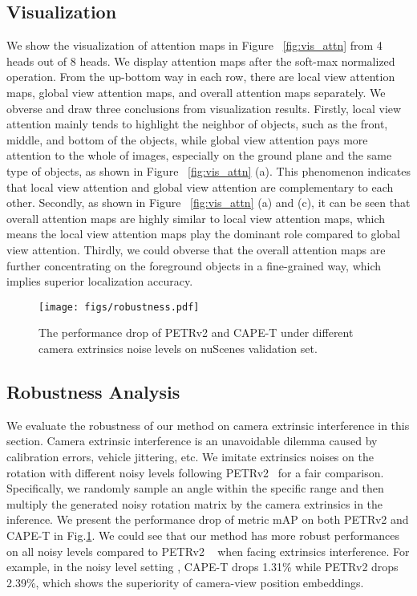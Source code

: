\documentclass[10pt,twocolumn,letterpaper]{article}
\newcommand{\ourMethod}{CAPE}
\begin{document}
\subsection{Visualization} 
We show the visualization of attention maps in Figure ~\ref{fig:vis_attn} from 4 heads out of 8 heads. We display attention maps after the soft-max normalized operation. From the up-bottom way in each row, there are local view attention maps, global view attention maps, and overall attention maps separately. We obverse and draw three conclusions from visualization results. Firstly, local view attention mainly tends to highlight the neighbor of objects, such as the front, middle, and bottom of the objects, while global view attention pays more attention to the whole of images, especially on the ground plane and the same type of objects, as shown in  Figure ~\ref{fig:vis_attn} (a). 
This phenomenon indicates that local view attention and global view attention are complementary to each other. Secondly, as shown in Figure ~\ref{fig:vis_attn} (a) and (c), it can be seen that overall attention maps are highly similar to local view attention maps, which means the local view attention maps play the dominant role compared to global view attention. Thirdly, we could obverse that the overall attention maps are further concentrating on the foreground objects in a fine-grained way, which implies superior localization accuracy.


\begin{figure}[t]
\centering
\texttt{[image: figs/robustness.pdf]}
\vspace{-10pt}
\caption{The performance drop of PETRv2 and \ourMethod{}-T under different camera extrinsics noise levels on nuScenes validation set.}
\centering
\label{fig:robustness}
\vspace{-10pt}
\end{figure}

\subsection{Robustness Analysis}
We evaluate the robustness of our method on camera extrinsic interference in this section. Camera extrinsic interference is an unavoidable dilemma caused by calibration errors, vehicle jittering, etc. We imitate extrinsics noises on the rotation with different noisy levels following PETRv2~\cite{liu2022petrv2} for a fair comparison. Specifically, we randomly sample an angle within the specific range and then multiply the generated noisy rotation matrix by the camera extrinsics in the inference. We present the performance drop of metric mAP on both PETRv2 and \ourMethod{}-T in Fig.\ref{fig:robustness}. We could see that our method has more robust performances on all noisy levels compared to PETRv2 ~\cite{liu2022petrv2} when facing extrinsics interference. For example, in the noisy level setting , \ourMethod{}-T drops 1.31\% while PETRv2 drops 2.39\%, which shows the superiority of camera-view position embeddings. 
\end{document}
